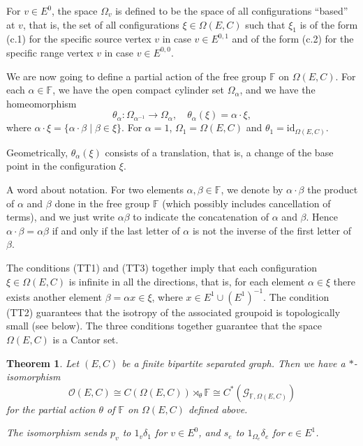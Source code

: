 \documentclass[11pt]{amsart}
\theoremstyle{plain}            %
\newtheorem{theorem}{Theorem}[section]
\theoremstyle{definition}       %
\theoremstyle{definition}       %
\theoremstyle{remark}
\newcommand{\F}{\mathbb F}
\begin{document}


For $v \in E^0$, the space $\Omega_v$ is defined to be the space of all configurations ``based'' at $v$, that is, the set of all configurations $\xi \in \Omega(E,C)$
such that $\xi_1$ is of the form (c.1) for the specific source vertex $v$ in case $v \in E^{0,1}$ and of the form (c.2) for the specific range vertex $v$ in case $v \in E^{0,0}$.

We are now going to define a partial action of the free group $\F$ on $\Omega (E,C)$. 
For each $\alpha \in \F$, we have the open compact cylinder set $\Omega_{\alpha}$, and we have the homeomorphism
$$\theta_{\alpha} \colon \Omega_{\alpha^{-1}} \to \Omega_{\alpha}, \quad \theta_{\alpha}(\xi) = \alpha \cdot \xi,$$
where $\alpha \cdot \xi = \{\alpha \cdot \beta \mid \beta \in \xi\}$. For $\alpha = 1$, $\Omega_1 = \Omega(E,C)$ and $\theta_1 = \mathrm{id}_{\Omega(E,C)}$.

Geometrically, $\theta_\alpha (\xi)$ consists of a translation, that is, a change of the base point in the configuration $\xi$.

A word about notation. For two elements $\alpha,\beta\in \F$, we denote by $\alpha\cdot \beta$ the product of $\alpha$ and $\beta$ done in the free group $\F$ (which possibly includes cancellation of terms), and we just write $\alpha \beta$ to indicate the concatenation of $\alpha$ and $\beta$. Hence $\alpha\cdot \beta =\alpha \beta$ if and only if the last letter of $\alpha$ is not the inverse of the first letter of $\beta$. 

  The conditions (TT1) and (TT3) together imply that each configuration $\xi \in \Omega (E,C)$ is infinite in all the directions, that is, for each element $\alpha \in \xi$ there exists another element 
$\beta = \alpha x \in \xi$, where $x\in E^1\cup (E^1)^{-1}$. The condition (TT2) guarantees that the isotropy of the associated groupoid is topologically small (see below). The three conditions together guarantee that the space $\Omega (E,C)$ is a Cantor set. 

\begin{theorem} {\rm{\cite{ae14}}}
	\label{thm:charac-tame}
	Let $(E,C)$ be a finite bipartite separated graph. Then we have a $*$-isomorphism
	$$\mathcal O (E,C) \cong C(\Omega (E,C)) \rtimes _\theta \F \cong C^* (\mathcal G_{\F,\Omega(E,C)})$$
	for the partial action $\theta $ of $\F$ on $\Omega(E,C)$ defined above. 
	
	The isomorphism sends $p_v$ to $1_v \delta_1$ for $v\in E^0$, and $s_e$ to $1_{\Omega_e}\delta_e$ for $e\in E^1$. 
\end{theorem}
\end{document}
